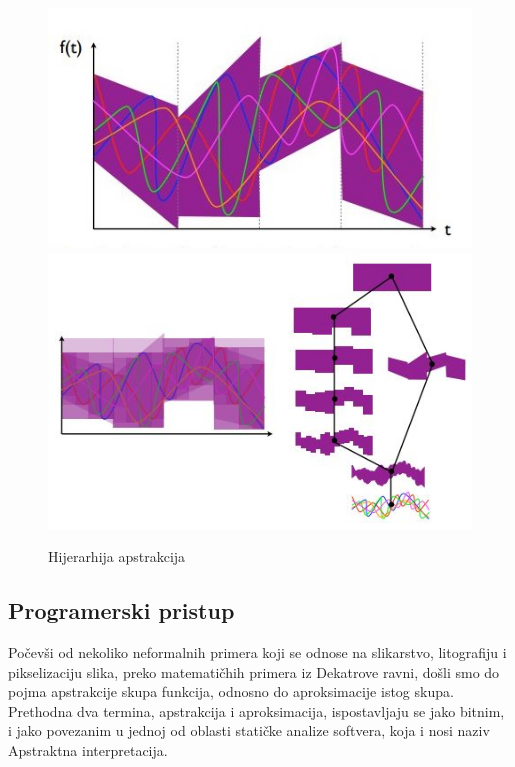 \documentclass[a4paper]{article}
\begin{document}
\begin{figure}[h!]
\begin{center}
\includegraphics[scale=0.4]{f7.JPG}
\includegraphics[scale=0.4]{f8.JPG}
\end{center}
\caption{Hijerarhija apstrakcija}
\label{fig:f78}
\end{figure} \newline

\subsection{Programerski pristup}

Počevši od nekoliko neformalnih primera koji se odnose na slikarstvo, litografiju i pikselizaciju slika, preko matematičhih primera iz Dekatrove ravni, došli smo do pojma apstrakcije skupa funkcija, odnosno do aproksimacije istog skupa. Prethodna dva termina, apstrakcija i aproksimacija, ispostavljaju se jako bitnim, i jako povezanim u jednoj od oblasti statičke analize softvera, koja i nosi naziv Apstraktna interpretacija. \newline
\end{document}
